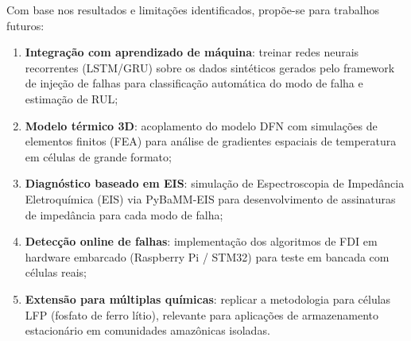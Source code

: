 \documentclass[
    12pt,
    openright,
    twoside,
    a4paper,
    brazil,
    english
]{abntex2}
\begin{document}
Com base nos resultados e limitações identificados, propõe-se para trabalhos
futuros:

\begin{enumerate}
  \item \textbf{Integração com aprendizado de máquina}: treinar redes neurais
        recorrentes (LSTM/GRU) sobre os dados sintéticos gerados pelo framework
        de injeção de falhas para classificação automática do modo de falha e
        estimação de RUL;

  \item \textbf{Modelo térmico 3D}: acoplamento do modelo DFN com simulações
        de elementos finitos (FEA) para análise de gradientes espaciais de
        temperatura em células de grande formato;

  \item \textbf{Diagnóstico baseado em EIS}: simulação de Espectroscopia de
        Impedância Eletroquímica (EIS) via PyBaMM-EIS para desenvolvimento de
        assinaturas de impedância para cada modo de falha;

  \item \textbf{Detecção online de falhas}: implementação dos algoritmos de FDI
        em hardware embarcado (Raspberry Pi / STM32) para teste em bancada com
        células reais;

  \item \textbf{Extensão para múltiplas químicas}: replicar a metodologia para
        células LFP (fosfato de ferro lítio), relevante para aplicações de
        armazenamento estacionário em comunidades amazônicas isoladas.
\end{enumerate}

\postextual
\end{document}
